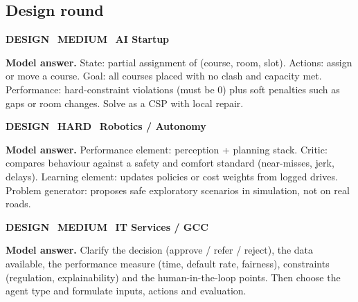 \documentclass[11pt]{article}
\begin{document}
\subsection*{\color{crimson}Design round}
\begin{tcolorbox}[enhanced,breakable,colback=white,colframe=crimson,arc=2mm,boxrule=0.8pt,left=3mm,right=3mm,
 title={\textbf{QI.09}\quad Design an agent that schedules campus classrooms. Give the state space and the performance measure.},fonttitle=\color{white}\small,colbacktitle=crimson]
\colorbox{crimson!15}{\scriptsize\bfseries\color{crimson} DESIGN}\
\colorbox{gold!85!black!15}{\scriptsize\bfseries\color{gold!85!black} MEDIUM}\
\colorbox{navy!8}{\scriptsize\bfseries\color{navy} AI Startup}\par\smallskip
\textbf{\color{navy}Model answer.} State: partial assignment of (course, room, slot). Actions: assign or move a course. Goal: all courses placed with no clash and capacity met. Performance: hard-constraint violations (must be 0) plus soft penalties such as gaps or room changes. Solve as a CSP with local repair.
\end{tcolorbox}
\begin{tcolorbox}[enhanced,breakable,colback=white,colframe=crimson,arc=2mm,boxrule=0.8pt,left=3mm,right=3mm,
 title={\textbf{QI.10}\quad Design a learning agent for an autonomous shuttle on a university campus. What are the critic and the problem generator?},fonttitle=\color{white}\small,colbacktitle=crimson]
\colorbox{crimson!15}{\scriptsize\bfseries\color{crimson} DESIGN}\
\colorbox{crimson!15}{\scriptsize\bfseries\color{crimson} HARD}\
\colorbox{navy!8}{\scriptsize\bfseries\color{navy} Robotics / Autonomy}\par\smallskip
\textbf{\color{navy}Model answer.} Performance element: perception + planning stack. Critic: compares behaviour against a safety and comfort standard (near-misses, jerk, delays). Learning element: updates policies or cost weights from logged drives. Problem generator: proposes safe exploratory scenarios in simulation, not on real roads.
\end{tcolorbox}
\begin{tcolorbox}[enhanced,breakable,colback=white,colframe=crimson,arc=2mm,boxrule=0.8pt,left=3mm,right=3mm,
 title={\textbf{QI.11}\quad A bank wants 'AI' to reduce loan-processing time. How do you turn this into a well-defined AI problem?},fonttitle=\color{white}\small,colbacktitle=crimson]
\colorbox{crimson!15}{\scriptsize\bfseries\color{crimson} DESIGN}\
\colorbox{gold!85!black!15}{\scriptsize\bfseries\color{gold!85!black} MEDIUM}\
\colorbox{navy!8}{\scriptsize\bfseries\color{navy} IT Services / GCC}\par\smallskip
\textbf{\color{navy}Model answer.} Clarify the decision (approve / refer / reject), the data available, the performance measure (time, default rate, fairness), constraints (regulation, explainability) and the human-in-the-loop points. Then choose the agent type and formulate inputs, actions and evaluation.
\end{tcolorbox}
\end{document}
